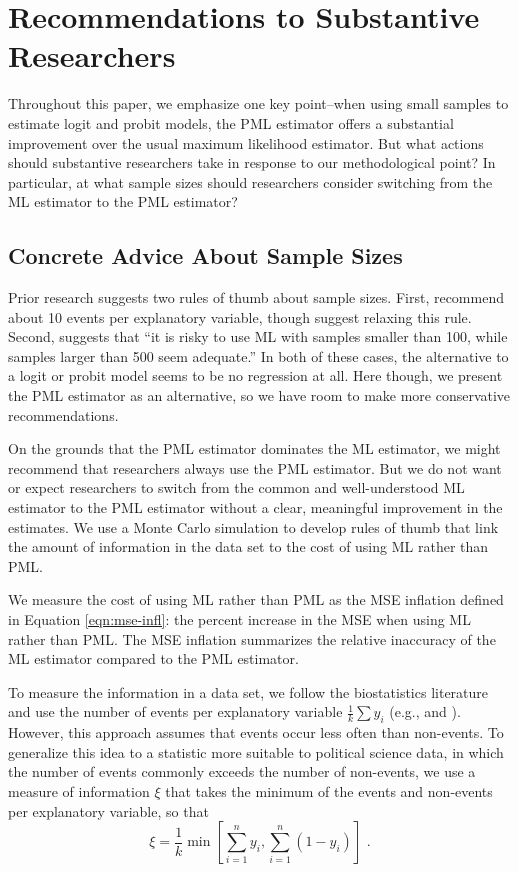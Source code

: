 \documentclass[12pt]{article}
\begin{document}
\section*{Recommendations to Substantive Researchers}

Throughout this paper, we emphasize one key point--when using small samples to estimate logit and probit models, the PML estimator offers a substantial improvement over the usual maximum likelihood estimator. 
But what actions should substantive researchers take in response to our methodological point? 
In particular, at what sample sizes should researchers consider switching from the ML estimator to the PML estimator?

\subsection*{Concrete Advice About Sample Sizes}

Prior research suggests two rules of thumb about sample sizes.
First, \cite{Peduzzietal1996} recommend about 10 events per explanatory variable, though \cite{VittinghoffMcCulloch2007} suggest relaxing this rule. 
Second, \citet[p. 54]{Long1997} suggests that ``it is risky to use ML with samples smaller than 100, while samples larger than 500 seem adequate.'' 
In both of these cases, the alternative to a logit or probit model seems to be no regression at all.
Here though, we present the PML estimator as an alternative, so we have room to make more conservative recommendations.

On the grounds that the PML estimator dominates the ML estimator, we might recommend that researchers always use the PML estimator. 
But we do not want or expect researchers to switch from the common and well-understood ML estimator to the PML estimator without a clear, meaningful improvement in the estimates. We use a Monte Carlo simulation to develop rules of thumb that link the amount of information in the data set to the cost of using ML rather than PML. 

We measure the cost of using ML rather than PML as the MSE inflation defined in Equation \ref{eqn:mse-infl}: the percent increase in the MSE when using ML rather than PML. 
The MSE inflation summarizes the relative inaccuracy of the ML estimator compared to the PML estimator.

To measure the information in a data set, we follow the biostatistics literature and use the number of events per explanatory variable $\frac{1}{k}\sum y_i$ (e.g., \citealt{Peduzzietal1996} and \citealt{VittinghoffMcCulloch2007}).
However, this approach assumes that events occur less often than non-events. 
To generalize this idea to a statistic more suitable to political science data, in which the number of events commonly exceeds the number of non-events, we use a measure of information $\xi$ that takes the minimum of the events and non-events per explanatory variable, so that
\begin{equation}
\xi = \frac{1}{k}\min \left[ \sum_{i = 1}^n y_i, \sum_{i = 1}^n(1 - y_i) \right]\text{ .}
\end{equation}
\end{document}
